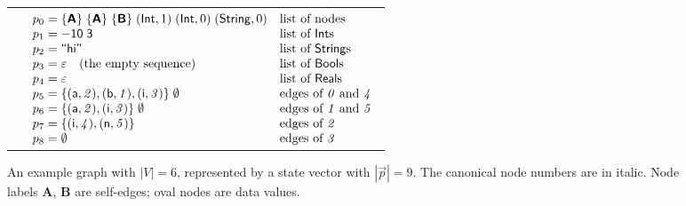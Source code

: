 \begin{figure}
\begin{center}
\begin{tabular}{@{}p{4cm}p{10cm}}
\begin{center}
\renewcommand{\userdefinedmacro}{
\node [above=.1 of n0] {\rm\textit{0}};
\node [below=.1 of n1] {\rm\textit{1}};
\node [above=.1 of n2] {\rm\textit{2}};
\node [above=.1 of n3] {\rm\textit{3}};
\node [above=.1 of n4] {\rm\textit{4}};
\node [below=.1 of n5] {\rm\textit{5}};
}
\vspace*{-5mm}

\end{center}
&
$\begin{array}[t]{l@{{\;=\;}}ll}
p_0 & \set{\mbox{\textsf{\bfseries A}}}\;
      \set{\mbox{\textsf{\bfseries A}}}\;
      \set{\mbox{\textsf{\bfseries B}}}\;
      (\Int,1)\;(\Int,0)\;(\String,0) 
    & \mbox{list of nodes} \\
p_1 & \mathsf{-10} \; \mathsf{3} 
    & \mbox{list of $\Int$s} \\
p_2 & \mbox{\textsf{``hi''}}
    & \mbox{list of $\String$s} \\
p_3 & \emptystr \quad\mbox{(the empty sequence)}
    & \mbox{list of $\Bool$s} \\
p_4 & \emptystr
    & \mbox{list of $\Real$s} \\
p_5 & \set{(\mathsf a,\mathit 2),(\mathsf b,\mathit 1),(\mathsf i,\mathit 3)} \;
      \emptyset
    & \mbox{edges of \textit 0 and \textit 4} \\
p_6 & \set{(\mathsf a,\mathit 2),(\mathsf i,\mathit 3)} \;
      \emptyset
    & \mbox{edges of \textit 1 and \textit 5} \\
p_7 & \set{(\mathsf i,\mathit 4),(\mathsf n,\mathit 5)}
    & \mbox{edges of \textit 2} \\
p_8 & \emptyset
    & \mbox{edges of \textit 3}
\end{array}$
\end{tabular}
\vspace*{-5mm}
\caption{An example graph with $|V|=6$, represented by a state vector with
  $|\vec p|=9$.
  The canonical node numbers are in italic. Node labels
  \textsf{\bfseries A}, \textsf{\bfseries B} are self-edges; oval nodes are
  data values.}
\end{center}
\vspace*{-5mm}
\end{figure}%

